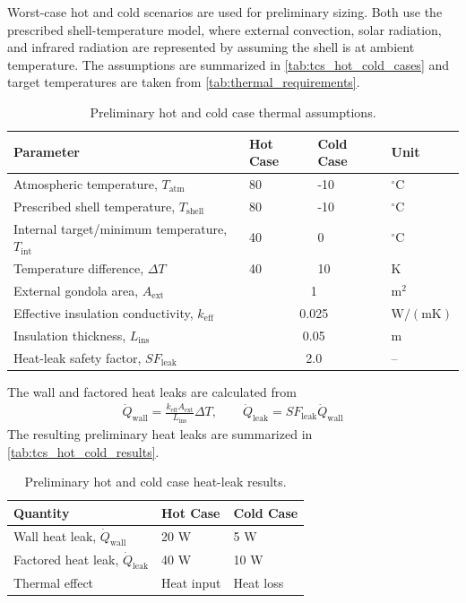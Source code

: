 Worst-case hot and cold scenarios are used for preliminary sizing. Both use the prescribed shell-temperature model, where external convection, solar radiation, and infrared radiation are represented by assuming the shell is at ambient temperature. The assumptions are summarized in \autoref{tab:tcs_hot_cold_cases} and target temperatures are taken from \autoref{tab:thermal_requirements}.
\begin{table}[H]
\centering
\caption{Preliminary hot and cold case thermal assumptions.}
\label{tab:tcs_hot_cold_cases}
\renewcommand{\arraystretch}{1.1}
\begin{tabular}{|p{7.0cm}|p{1.6cm}|p{1.8cm}|p{1.4cm}|}
\hline
\textbf{Parameter} & \textbf{Hot Case} & \textbf{Cold Case} & \textbf{Unit} \\
\hline
Atmospheric temperature, \(T_{\mathrm{atm}}\) & 80 & -10 & \(^{\circ}\mathrm{C}\) \\
\hline
Prescribed shell temperature, \(T_{\mathrm{shell}}\) & 80 & -10 & \(^{\circ}\mathrm{C}\) \\
\hline
Internal target/minimum temperature, \(T_{\mathrm{int}}\) & 40 & 0 & \(^{\circ}\mathrm{C}\) \\
\hline
Temperature difference, \(\Delta T\) & 40 & 10 & K \\
\hline
External gondola area, \(A_{\mathrm{ext}}\) & \multicolumn{2}{c|}{1} & \(\mathrm{m^2}\) \\
\hline
Effective insulation conductivity, \(k_{\mathrm{eff}}\) & \multicolumn{2}{c|}{0.025} & \(\mathrm{W/(mK)}\) \\
\hline
Insulation thickness, \(L_{\mathrm{ins}}\) & \multicolumn{2}{c|}{0.05} & m \\
\hline
Heat-leak safety factor, \(SF_{\mathrm{leak}}\) & \multicolumn{2}{c|}{2.0} & -- \\
\hline
\end{tabular}
\end{table}
The wall and factored heat leaks are calculated from
\begin{align}
    \dot{Q}_{\mathrm{wall}} =
    \frac{k_{\mathrm{eff}} A_{\mathrm{ext}}}{L_{\mathrm{ins}}}
    \Delta T,
    \qquad
    \dot{Q}_{\mathrm{leak}} =
    SF_{\mathrm{leak}}\dot{Q}_{\mathrm{wall}}
    \label{eq:q_wall_and_leak_case}
\end{align}
The resulting preliminary heat leaks are summarized in \autoref{tab:tcs_hot_cold_results}.
\begin{table}[H]
\centering
\caption{Preliminary hot and cold case heat-leak results.}
\label{tab:tcs_hot_cold_results}
\renewcommand{\arraystretch}{1.1}
\begin{tabular}{|p{5.2cm}|p{2.6cm}|p{2.6cm}|}
\hline
\textbf{Quantity} & \textbf{Hot Case} & \textbf{Cold Case} \\
\hline
Wall heat leak, \(\dot{Q}_{\mathrm{wall}}\) & 20 W & 5 W \\
\hline
Factored heat leak, \(\dot{Q}_{\mathrm{leak}}\) & 40 W & 10 W \\
\hline
Thermal effect & Heat input & Heat loss \\
\hline
\end{tabular}
\end{table}




